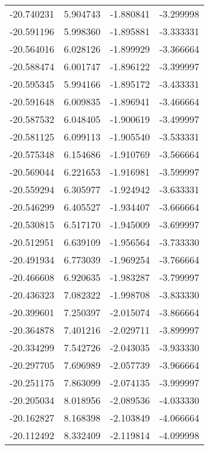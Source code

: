 \begin{tabular}{rrrr}
      -20.740231 &         5.904743 &   -1.880841 &  -3.299998 \\
      -20.591196 &         5.998360 &   -1.895881 &  -3.333331 \\
      -20.564016 &         6.028126 &   -1.899929 &  -3.366664 \\
      -20.588474 &         6.001747 &   -1.896122 &  -3.399997 \\
      -20.595345 &         5.994166 &   -1.895172 &  -3.433331 \\
      -20.591648 &         6.009835 &   -1.896941 &  -3.466664 \\
      -20.587532 &         6.048405 &   -1.900619 &  -3.499997 \\
      -20.581125 &         6.099113 &   -1.905540 &  -3.533331 \\
      -20.575348 &         6.154686 &   -1.910769 &  -3.566664 \\
      -20.569044 &         6.221653 &   -1.916981 &  -3.599997 \\
      -20.559294 &         6.305977 &   -1.924942 &  -3.633331 \\
      -20.546299 &         6.405527 &   -1.934407 &  -3.666664 \\
      -20.530815 &         6.517170 &   -1.945009 &  -3.699997 \\
      -20.512951 &         6.639109 &   -1.956564 &  -3.733330 \\
      -20.491934 &         6.773039 &   -1.969254 &  -3.766664 \\
      -20.466608 &         6.920635 &   -1.983287 &  -3.799997 \\
      -20.436323 &         7.082322 &   -1.998708 &  -3.833330 \\
      -20.399601 &         7.250397 &   -2.015074 &  -3.866664 \\
      -20.364878 &         7.401216 &   -2.029711 &  -3.899997 \\
      -20.334299 &         7.542726 &   -2.043035 &  -3.933330 \\
      -20.297705 &         7.696989 &   -2.057739 &  -3.966664 \\
      -20.251175 &         7.863099 &   -2.074135 &  -3.999997 \\
      -20.205034 &         8.018956 &   -2.089536 &  -4.033330 \\
      -20.162827 &         8.168398 &   -2.103849 &  -4.066664 \\
      -20.112492 &         8.332409 &   -2.119814 &  -4.099998 \\

\end{tabular}
